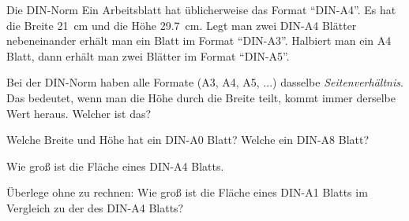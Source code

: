 \documentclass[12pt,a5paper,landscape]{scrartcl}
\begin{document}
	\begin{karte3}{Die DIN-Norm}
		Ein Arbeitsblatt hat üblicherweise das Format \enquote{DIN-A4}. Es hat die Breite \SI{21}{\centi\meter} und die Höhe \SI{29,7}{\centi\meter}. Legt man zwei DIN-A4 Blätter nebeneinander erhält man ein Blatt im Format \enquote{DIN-A3}. Halbiert man ein A4 Blatt, dann erhält man zwei Blätter im Format \enquote{DIN-A5}.

		\begin{enuma}
			\item Bei der DIN-Norm haben alle Formate (A3, A4, A5, ...) dasselbe \emph{Seitenverhältnis}. Das bedeutet, wenn man die Höhe durch die Breite teilt, kommt immer derselbe Wert heraus. Welcher ist das?
			\item Welche Breite und Höhe hat ein DIN-A0 Blatt? Welche ein DIN-A8 Blatt?
			\item Wie groß ist die Fläche eines DIN-A4 Blatts.
			\item Überlege ohne zu rechnen: Wie groß ist die Fläche eines DIN-A1 Blatts im Vergleich zu der des DIN-A4 Blatts?
		\end{enuma}
	\end{karte3}

	\begin{loesungskarte}
	\end{loesungskarte}
\end{document}
